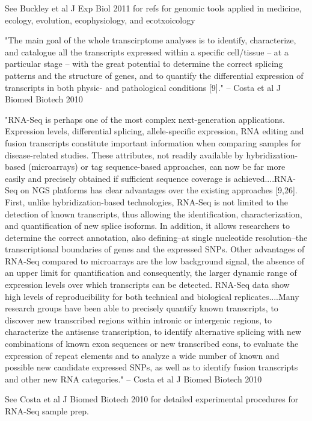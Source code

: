 \documentclass[10pt]{article}
\begin{document}
See Buckley et al J Exp Biol 2011 for refs for genomic tools applied in medicine, ecology, evolution, ecophysiology, and ecotxoicology

"The main goal of the whole transcirptome analyses is to identify, characterize, and catalogue all the transcripts expressed within a specific cell/tissue -- at a particular stage -- with the great potential to determine the correct splicing patterns and the structure of genes, and to quantify the differential expression of transcripts in both physic- and pathological conditions [9]." -- Costa et al J Biomed Biotech 2010

"RNA-Seq is perhaps one of the most complex next-generation applications.  Expression levels, differential splicing, allele-specific expression, RNA editing and fusion transcripts constitute important information when comparing samples for disease-related studies.  These attributes, not readily available by hybridization-based (microarrays) or tag sequence-based approaches, can now be far more easily and precisely obtained if sufficient sequence coverage is achieved....RNA-Seq on NGS platforms has clear advantages over the existing approaches [9,26].  First, unlike hybridization-based technologies, RNA-Seq is not limited to the detection of known transcripts, thus allowing the identification, characterization, and quantification of new splice isoforms.  In addition, it allows researchers to determine the correct annotation, also defining--at single nucleotide resolution--the transcriptional boundaries of genes and the expressed SNPs.  Other advantages of RNA-Seq compared to microarrays are the low background signal, the absence of an upper limit for quantification and consequently, the larger dynamic range of expression levels over which transcripts can be detected.  RNA-Seq data show high levels of reproducibility for both technical and biological replicates....Many research groups have been able to precisely quantify known transcripts, to discover new transcribed regions within intronic or intergenic regions, to characterize the antisense transcription, to identify alternative splicing with new combinations of known exon sequences or new transcribed eons, to evaluate the expression of repeat elements and to analyze a wide number of known and possible new candidate expressed SNPs, as well as to identify fusion transcripts and other new RNA categories." -- Costa et al J Biomed Biotech 2010

See Costa et al J Biomed Biotech 2010 for detailed experimental procedures for RNA-Seq sample prep.
\end{document}
